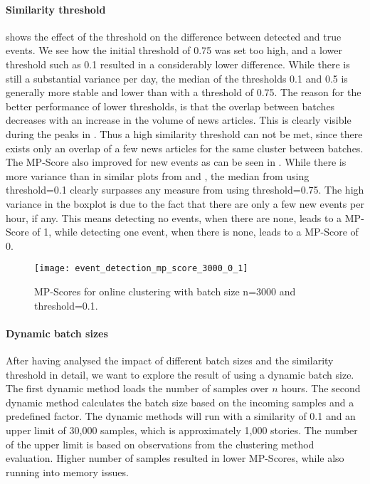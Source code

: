 \paragraph{Similarity threshold}
shows the effect of the threshold on the difference between detected and true events.
We see how the initial threshold of 0.75 was set too high,
and a lower threshold such as 0.1 resulted in a considerably lower difference.
While there is still a substantial variance per day, the median of the thresholds 0.1 and 0.5
is generally more stable and lower than with a threshold of 0.75.
The reason for the better performance of lower thresholds,
is that the overlap between batches decreases with an increase in the volume of news articles.
This is clearly visible during the peaks in .
Thus a high similarity threshold can not be met,
since there exists only an overlap of a few news articles for the same cluster between batches.
The MP-Score also improved for new events as can be seen in .
While there is more variance than in similar plots from 
and ,
the median from using threshold=0.1 clearly surpasses any measure from using threshold=0.75.
The high variance in the boxplot is due to the fact that there are only a few new events per hour, if any.
This means detecting no events, when there are none, leads to a MP-Score of 1,
while detecting one event, when there is none, leads to a MP-Score of 0.

\begin{figure}[h]
    \centering
    \texttt{[image: event\_detection\_mp\_score\_3000\_0\_1]}
    \caption{MP-Scores for online clustering with batch size n=3000 and threshold=0.1.}
    \label{fig:event_detection_mp_score_3000_0_1}
\end{figure}

\paragraph{Dynamic batch sizes}
After having analysed the impact of different batch sizes and the similarity threshold in detail,
we want to explore the result of using a dynamic batch size.
The first dynamic method loads the number of samples over $n$ hours.
The second dynamic method calculates the batch size based on the incoming samples and a predefined factor.
The dynamic methods will run with a similarity of 0.1 and an upper limit of 30,000 samples,
which is approximately 1,000 stories.
The number of the upper limit is based on observations from the clustering method evaluation.
Higher number of samples resulted in lower MP-Scores, while also running into memory issues.

